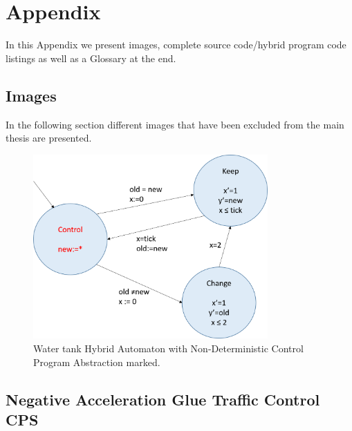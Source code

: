 


\chapter{Appendix}
\label{chap:appendix}
In this Appendix we present images, complete source code/hybrid program code listings as well as a Glossary at the end.

\section{Images}
\label{app:sec:images}

In the following section different images that have been excluded from the main thesis are presented.

	\begin{figure}[h!]
		\centering
		\includegraphics[height=0.5\textheight,width=0.8\textwidth]{Images/ha_control}
		\caption{Water tank Hybrid Automaton with Non-Deterministic Control Program Abstraction marked.}
		\label{fig:ex_control}
	\end{figure}

\section{Negative Acceleration Glue Traffic Control CPS}
\label{app:sec:neg}

